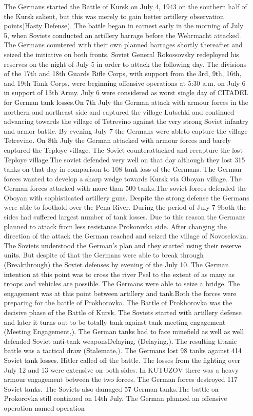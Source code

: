 \documentclass[]{article}
\begin{document}
The Germans started the Battle of Kursk on July 4, 1943 on the southern half of the Kursk salient, but this was merely to gain better artillery observation points(\Gls{Hasty Defense}). The battle began in earnest early in the morning of July 5, when Soviets conducted an artillery barrage before the 
Wehrmacht attacked. The Germans countered with their own planned barrages shortly thereafter 
and seized the initiative on both fronts. Soviet General Rokossovsky redeployed his reserves on 
the night of July 5 in order to attack the following day. The divisions of the 17th and 18th Guards 
Rifle Corps, with support from the 3rd, 9th, 16th, and 19th Tank Corps, were beginning offensive operations at 5:30 a.m. on July 6 in support of 13th Army. July 6 were considered as worst single day of CITADEL for German tank losses.On 7th July the German attack with armour forces in the northern and northeast side and captured the village Lutschki and continued advancing towards the village of Tetrevino against the very strong Soviet infantry and armor battle. By evening July 7 the Germans were ableto capture the village Tetrevino. On 8th July the German attacked with armour forces and barely captured the Teploye village. The Soviet counterattacked and recapture the lost Teploye village.The soviet defended very well on that day although they lost 315 tanks on that day in comparison to 108 tank loss of the Germans. The German forces wanted to develop a sharp wedge towards Kursk via Oboyan village. The German forces attacked with more than 500 tanks.The soviet forces defended the Oboyan with sophisticated artillery guns. Despite the strong defense the Germans were able to foothold over the Pena River. During the period of July 7-9both the sides had suffered largest number of tank losses. Due to this reason the Germans planned to attack from less resistance Prokorovka side. After changing the direction of the attack the German reached and seized the village of Novoselovka. The Soviets understood the German's plan and they started using their reserve units. But despite of that the Germans were able to break through (\Gls{Breakthrough}) the Soviet defenses by evening of the July 10. The German intention at this point was to cross the river Psel to the extent of as many as troops and vehicles are possible. The Germans were able to seize a bridge. The engagement was at this point between artillery and tank.Both the forces were preparing for the battle of Prokhorovka. The Battle of Prokhorovka was the decisive phase of the Battle of Kursk. The Soviets started with artillery defense and later it turns out to be totally tank against tank meeting engagement (\Gls{Meeting Engagement},). The German tanks had to face minefield as well as well defended Soviet anti-tank weapons\Gls{Delaying}, (\Gls{Delaying},). The resulting titanic battle was a tactical draw (\Gls{Stalemate},). The Germans lost 98 tanks against 414 Soviet tank losses. Hitler called off the battle. The losses from the fighting over July 12 and 13 were extensive on both sides. In KUTUZOV there was a heavy armour engagement between the two forces. The German forces destroyed 117 Soviet tanks. The Soviets also damaged 57 German tanks.The battle on Prokorovka still continued on 14th July. The German planned an offensive operation named operation 
\end{document}
